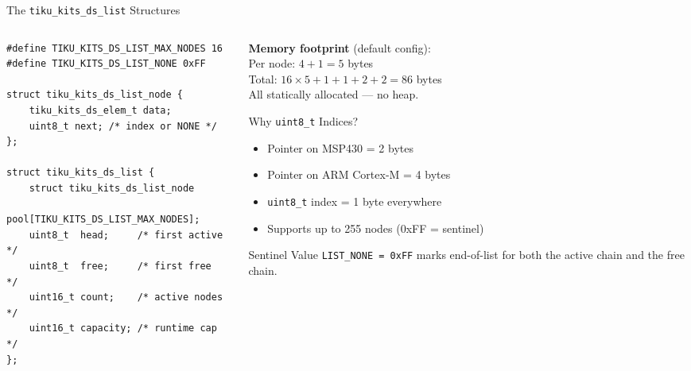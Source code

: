 \documentclass[aspectratio=169, 10pt]{beamer}
\begin{document}
\begin{frame}[fragile]{The \texttt{tiku\_kits\_ds\_list} Structures}
\begin{columns}[T]
\begin{column}{0.48\textwidth}
\begin{lstlisting}[style=cstyle,
  title={ds/list/tiku\_kits\_ds\_list.h}]
#define TIKU_KITS_DS_LIST_MAX_NODES 16
#define TIKU_KITS_DS_LIST_NONE 0xFF

struct tiku_kits_ds_list_node {
    tiku_kits_ds_elem_t data;
    uint8_t next; /* index or NONE */
};

struct tiku_kits_ds_list {
    struct tiku_kits_ds_list_node
        pool[TIKU_KITS_DS_LIST_MAX_NODES];
    uint8_t  head;     /* first active  */
    uint8_t  free;     /* first free    */
    uint16_t count;    /* active nodes  */
    uint16_t capacity; /* runtime cap   */
};
\end{lstlisting}
\end{column}

\begin{column}{0.48\textwidth}
\textbf{Memory footprint} (default config):\\
Per node: $4 + 1 = 5$ bytes\\
Total: $16 \times 5 + 1 + 1 + 2 + 2 = 86$ bytes\\
All statically allocated --- no heap.

\vspace{0.5em}
\begin{block}{Why \texttt{uint8\_t} Indices?}
\begin{itemize}
  \item Pointer on MSP430 = 2 bytes
  \item Pointer on ARM Cortex-M = 4 bytes
  \item \texttt{uint8\_t} index = 1 byte everywhere
  \item Supports up to 255 nodes (0xFF = sentinel)
\end{itemize}
\end{block}

\vspace{0.3em}
\begin{alertblock}{Sentinel Value}
\texttt{LIST\_NONE = 0xFF} marks end-of-list for both
the active chain and the free chain.
\end{alertblock}
\end{column}
\end{columns}
\end{frame}
\end{document}

